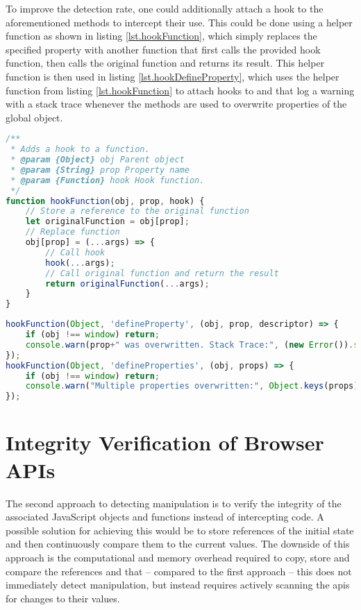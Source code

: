To improve the detection rate, one could additionally attach a hook to the aforementioned methods to intercept their use. This could be done using a helper function as shown in listing \ref{lst.hookFunction}, which simply replaces the specified property with another function that first calls the provided hook function, then calls the original function and returns its result. This helper function is then used in listing \ref{lst.hookDefineProperty}, which uses the helper function from listing \ref{lst.hookFunction} to attach hooks to  and  that log a warning with a stack trace whenever the methods are used to overwrite properties of the global  object.

\filbreak{}

\begin{lstlisting}[language=JavaScript,label={lst.hookFunction},caption={Function that allows adding a hook to another function}]
/**
 * Adds a hook to a function.
 * @param {Object} obj Parent object
 * @param {String} prop Property name
 * @param {Function} hook Hook function.
 */
function hookFunction(obj, prop, hook) {
    // Store a reference to the original function
    let originalFunction = obj[prop];
    // Replace function
    obj[prop] = (...args) => {
        // Call hook
        hook(...args);
        // Call original function and return the result
        return originalFunction(...args);
    }
}
\end{lstlisting}

\begin{lstlisting}[language=JavaScript,label={lst.hookDefineProperty},caption={Adding hooks to \icode{Object.defineProperty()} and \icode{Object.defineProperties()}}]
hookFunction(Object, 'defineProperty', (obj, prop, descriptor) => {
    if (obj !== window) return;
    console.warn(prop+" was overwritten. Stack Trace:", (new Error()).stack);
});
hookFunction(Object, 'defineProperties', (obj, props) => {
    if (obj !== window) return;
    console.warn("Multiple properties overwritten:", Object.keys(props), "Stack Trace:", (new Error()).stack);
});
\end{lstlisting}

\section{Integrity Verification of Browser APIs}
\label{sec.detectionVerification}

The second approach to detecting \browserAPI{} manipulation is to verify the integrity of the associated JavaScript objects and functions instead of intercepting code. A possible solution for achieving this would be to store references of the initial state and then continuously compare them to the current values. The downside of this approach is the computational and memory overhead required to copy, store and compare the references and that – compared to the first approach – this does not immediately detect manipulation, but instead requires actively scanning the \acp{api} for changes to their values.

